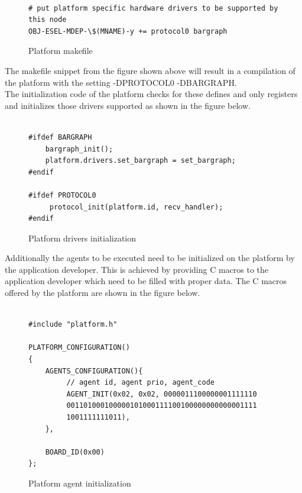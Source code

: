 \documentclass{scrreprt}
\begin{document}
\begin{figure}[!htb]
\begin{lstlisting}[frame=single]

# put platform specific hardware drivers to be supported by this node
OBJ-ESEL-MDEP-\$(MNAME)-y += protocol0 bargraph

\end{lstlisting}
\caption{Platform makefile}
\label{fig:platform-makefile}
\end{figure}

\noindent
The makefile snippet from the figure shown above will result in a compilation of the 
platform with the setting -DPROTOCOL0 -DBARGRAPH.\\

\noindent
The initialization code of the platform checks for these defines and only registers and initializes those drivers supported as shown in
the figure below.

\begin{figure}[!htb]
\begin{lstlisting}[frame=single]

#ifdef BARGRAPH
	bargraph_init();
	platform.drivers.set_bargraph = set_bargraph;
#endif

#ifdef PROTOCOL0
	 protocol_init(platform.id, recv_handler);
#endif

\end{lstlisting}
\caption{Platform drivers initialization}
\label{fig:platform-init}
\end{figure}

\noindent
Additionally the agents to be executed need to be initialized on the platform by the application developer.
This is achieved by providing C macros to the application developer which need to be filled with proper data.
The C macros offered by the platform are shown in the figure below. \\

\begin{figure}[!htb]
\lstset{language=C, tabsize=2}
\begin{lstlisting}[frame=single]

#include "platform.h"

PLATFORM_CONFIGURATION()
{
	AGENTS_CONFIGURATION(){
		 // agent id, agent prio, agent_code
		 AGENT_INIT(0x02, 0x02, 0000011100000001111110
		 001101000100000101000111100100000000000001111
		 1001111111011),
	},
	
	BOARD_ID(0x00)
};

\end{lstlisting}
\caption{Platform agent initialization}
\label{fig:platform-agent-init}
\end{figure}
\end{document}
